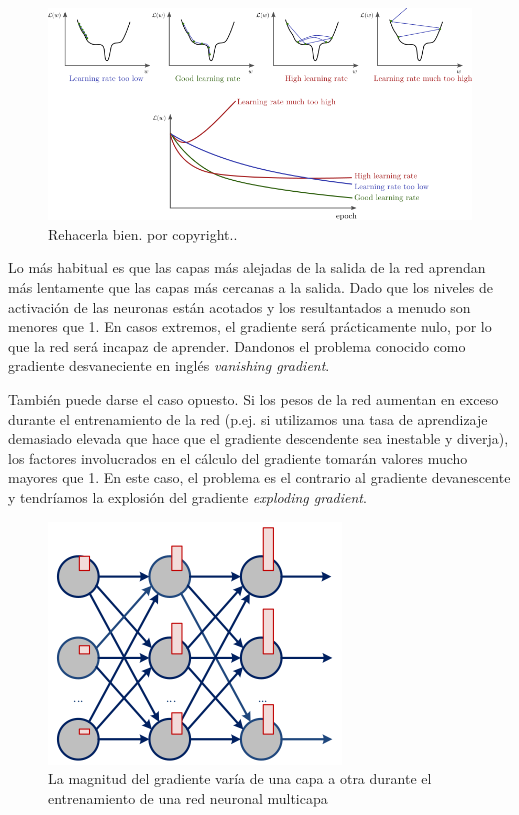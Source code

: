 \begin{figure}[H]
 \centering
 \includegraphics[scale=0.5]{../Figuras/gradiente.png}
 \caption{Rehacerla bien. por copyright..}
 \label{fig:gradiente}
\end{figure}

Lo más habitual es que las capas más alejadas de la salida de la red aprendan más lentamente que las capas más cercanas a la salida. Dado que los niveles de activación de las neuronas están acotados y los resultantados a menudo son menores que 1. En casos extremos, el gradiente será prácticamente nulo, por lo que la red será incapaz de aprender. Dandonos el 
 problema conocido como gradiente desvaneciente en inglés \emph{vanishing gradient}.

 También puede darse el caso opuesto. Si los pesos de la red aumentan en exceso durante el entrenamiento de la red (p.ej. si utilizamos una tasa de aprendizaje demasiado elevada que hace que el gradiente descendente sea inestable y diverja), los factores involucrados en el cálculo del gradiente tomarán valores mucho mayores que 1. En este caso, el problema es el contrario al gradiente devanescente y tendríamos la explosión del gradiente \emph{exploding gradient}.

\begin{figure}[H]
 \centering
 \includegraphics[scale=0.8]{../Figuras/vanish.png}
 \caption{La magnitud del gradiente varía de una capa a otra durante el entrenamiento de una red neuronal multicapa}
 \label{fig:vanish}
\end{figure}

